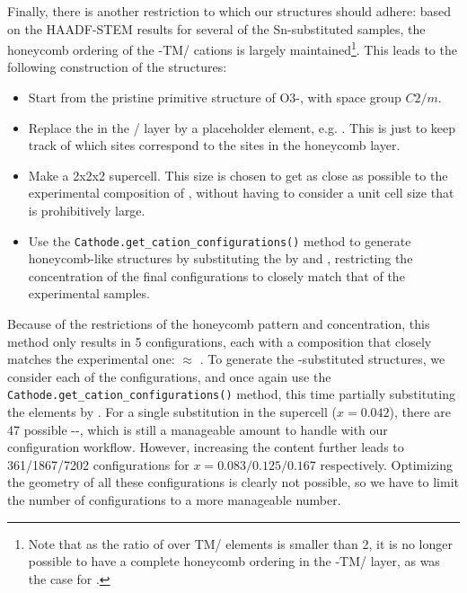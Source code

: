 \begin{refsection}
Finally, there is another restriction to which our structures should adhere: 
based on the HAADF-STEM results for several of the Sn-substituted samples, the 
honeycomb ordering of the -TM/ cations is largely 
maintained\footnote{Note that as the ratio of  over TM/ elements 
is smaller than 2, it is no longer possible to have a complete honeycomb 
ordering in the  -TM/ layer, as was the case for .}. 
This leads to the following construction of the  
structures:  
\begin{itemize} 
\item Start from the pristine primitive structure of O3-, with 
space group $C2/m$. 
\item Replace the  in the / layer by a placeholder 
element, e.g. . This is just to keep track of which sites correspond to 
the  sites in the honeycomb layer. 
\item Make a 2x2x2 supercell. This size is chosen to get as close as possible 
to the experimental composition of , without having to consider a unit 
cell size that is prohibitively large. 
\item Use the \texttt{Cathode.get\_cation\_configurations()} method to 
generate honeycomb-like structures by substituting the  by  and 
, restricting the  concentration of the final configurations to 
closely match that of the experimental samples. 
\end{itemize} 
Because of the restrictions of the honeycomb pattern and  
concentration, this method only results in 5 configurations, each with a 
composition that closely matches the experimental one: 
 $\approx$ . To generate 
the -substituted structures, we consider each of the  
configurations, and once again use the 
\texttt{Cathode.get\_cation\_configurations()} method, this time partially 
substituting the  elements by . For a single  
substitution in the supercell ($x = 0.042$), there are 47 possible 
--, which is still a manageable amount to handle with our 
configuration workflow. However, increasing the  content further leads 
to 361/1867/7202 configurations for $x = 0.083/0.125/0.167$ respectively. 
Optimizing the geometry of all these configurations is clearly not possible, 
so we have to limit the number of configurations to a more manageable number.  
 

\end{refsection}
